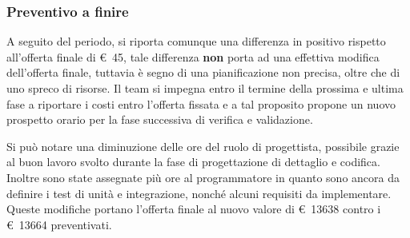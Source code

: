     \subsubsection{Preventivo a finire}
        A seguito del periodo, si riporta comunque una differenza in positivo rispetto all'offerta finale di \euro\ 45,
        tale differenza \textbf{non} porta ad una effettiva modifica dell'offerta finale, tuttavia è segno di una pianificazione non precisa,
        oltre che di uno spreco di risorse.
        Il team si impegna entro il termine della prossima e ultima fase a riportare i costi entro l'offerta fissata e a tal proposito propone
        un nuovo prospetto orario per la fase successiva di verifica e validazione.
        \def\salarycontent{
            {Amministratore,16,20,320},
            {Analista,0,25,0},
            {Progettista,$48-\noexpand\textbf{8}$,22,880},
            {Programmatore,$43+\noexpand\textbf{7}$,15,750},
            {Responsabile,15,30,450},
            {Verificatore,60,15,900},
            {Totale,176,127,$3371-\noexpand\textbf{71} = 3300 $ },
        }
        
        \label{table:nuovo_orario_verifica}
        Si può notare una diminuzione delle ore del ruolo di progettista, possibile grazie
        al buon lavoro svolto durante la fase di progettazione di dettaglio e codifica.
        Inoltre sono state assegnate più ore al programmatore in quanto sono ancora da definire
        i test di unità e integrazione, nonché alcuni requisiti da implementare. \\
        \noindent Queste modifiche portano l'offerta finale al nuovo valore di \euro\ 13638 contro
        i \euro\ 13664 preventivati. 